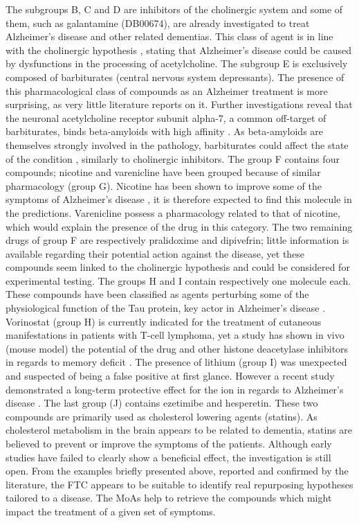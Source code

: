 \documentclass{bioinfo}
\begin{document}
The subgroups B, C and D are inhibitors of the cholinergic system and some of them, such as galantamine (DB00674), are already 
investigated to treat Alzheimer’s disease and other related dementias. This class of agent is in line with the 
cholinergic hypothesis \citep{Francis1999}, stating that Alzheimer’s disease could be caused by dysfunctions in the processing of 
acetylcholine. The subgroup E is exclusively composed of barbiturates (central nervous system depressants). 
The presence of this pharmacological class of compounds as an Alzheimer treatment is more surprising, as very little 
literature reports on it. Further investigations reveal that the neuronal acetylcholine receptor subunit alpha-7, a 
common off-target of barbiturates, binds beta-amyloids with high affinity \citep{Wang2000}. As beta-amyloids are themselves strongly involved 
in the pathology, barbiturates could affect the state of the condition \citep{Wang2000}, similarly to cholinergic inhibitors.
The group F contains four compounds; nicotine and varenicline have been grouped because of similar pharmacology (group G). 
Nicotine has been shown to improve some of the symptoms of Alzheimer’s disease \citep{Jones1992}, it is therefore expected to 
find this molecule in the predictions. Varenicline possess a pharmacology related to that of nicotine, which would explain 
the presence of the drug in this category. The two remaining drugs of group F are respectively pralidoxime and dipivefrin; 
little information is available regarding their potential action against the disease, yet these compounds seem linked to the 
cholinergic hypothesis and could be considered for experimental testing.
The groups H and I contain respectively one molecule each. These compounds have been classified as agents perturbing some of 
the physiological function of the Tau protein, key actor in Alzheimer's disease \citep{Grundke-Iqbal1986}. Vorinostat (group H) is currently 
indicated for the treatment of cutaneous manifestations in patients with T-cell lymphoma, yet a study has 
shown in vivo (mouse model) the potential of the drug and other histone deacetylase inhibitors in regards to memory 
deficit \citep{Kilgore2010}. The presence of lithium (group I) was 
unexpected and suspected of being a false positive at first glance. However a recent study demonstrated a long-term 
protective effect for the ion in regards to Alzheimer’s disease \citep{Young2011}. The last group (J) contains 
ezetimibe and hesperetin. These two compounds are primarily used as cholesterol lowering agents (statins). As cholesterol 
metabolism in the brain appears to be related to dementia, statins are believed to prevent or improve the symptoms of the 
patients. Although early studies \citep{Wolozin2004} have failed to clearly show a beneficial effect, the investigation is still open.
From the examples briefly presented above, reported and confirmed by the literature, the FTC appears to be suitable to 
identify real repurposing hypotheses tailored to a disease. The MoAs help to retrieve the compounds which might impact 
the treatment of a given set of symptoms.
\end{document}
